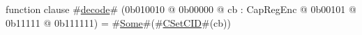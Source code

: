 function clause #\hyperref[sailMIPSzdecode]{decode}# (0b010010 @ 0b00000 @ cb : CapRegEnc @    0b00101 @    0b11111 @ 0b111111) = #\hyperref[sailMIPSzSome]{Some}#(#\hyperref[sailMIPSzCSetCID]{CSetCID}#(cb))
